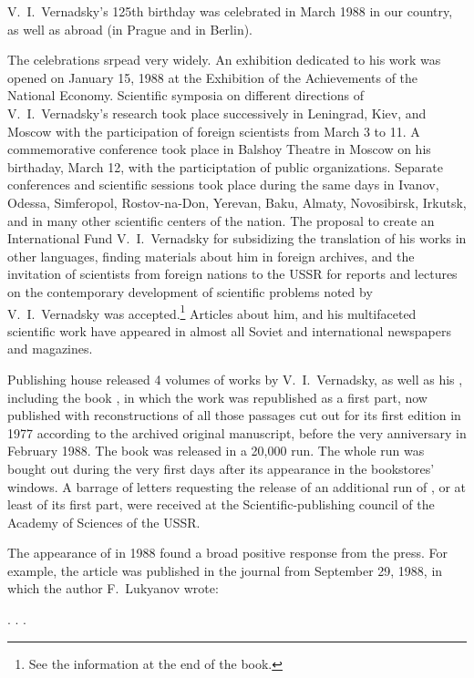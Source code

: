 V.~I.\ Vernadsky's 125th birthday was celebrated in March 1988 in our country,
as well as abroad (in Prague and in Berlin).

The celebrations srpead very widely.  An exhibition dedicated to his work was
opened on January 15, 1988 at the Exhibition of the Achievements of the
National Economy.  Scientific symposia on different directions of V.~I.\ Vernadsky's
research took place successively in Leningrad, Kiev, and Moscow with the
participation of foreign scientists from March 3 to 11.  A commemorative
conference took place in Balshoy Theatre in Moscow
on his birthaday, March 12, with the participtation of public organizations.
Separate conferences and scientific sessions took place during the same days in
Ivanov, Odessa, Simferopol, Rostov-na-Don, Yerevan, Baku,
Almaty, Novosibirsk, Irkutsk, and in many other
scientific centers of the nation.  The proposal to create an International Fund
V.~I.\ Vernadsky for
subsidizing the translation of his works in other languages, finding materials
about him in foreign archives, and the invitation of scientists from foreign
nations to the USSR for reports and lectures on the contemporary development of
scientific problems noted by V.~I.\ Vernadsky was accepted.\footnote{See the
information at the end of the book.}  Articles about him, and his multifaceted
scientific work have appeared in almost all Soviet and international newspapers
and magazines.

Publishing house  released 4 volumes of works
by V.~I.\ Vernadsky, as well as his , including the
book , in which the work  was republished as a first part, now
published with reconstructions of all those passages cut out for its first
edition in 1977 according to the archived original manuscript, before the very
anniversary in February 1988.  The book was released in a 20,000 run.  The whole
run was bought out during the very first days after its appearance in the
bookstores' windows.  A barrage of letters requesting the release of an
additional run of , or at least of its first
part, were received at the Scientific-publishing council of the Academy of
Sciences of the USSR.

The appearance of  in 1988 found a broad
positive response from the press.  For example, the article
 was published in the journal
 from September 29, 1988, in which the author
F.~Lukyanov wrote:

. . .
